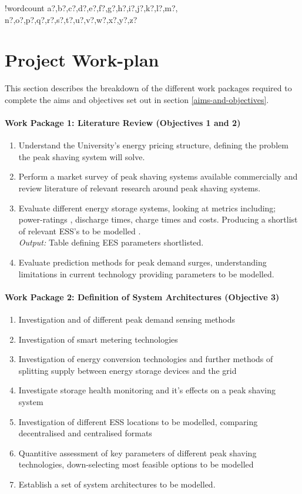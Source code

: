 \documentclass[10pt]{article}
\let\oldparagraph\paragraph
\renewcommand{\paragraph}[1]{\oldparagraph{#1}\mbox{}}
\newcounter{words}
\newenvironment{counted}{%
  \setcounter{words}{0}
  \SearchList!{wordcount}{\stepcounter{words}}
    {a?,b?,c?,d?,e?,f?,g?,h?,i?,j?,k?,l?,m?,
    n?,o?,p?,q?,r?,s?,t?,u?,v?,w?,x?,y?,z?}
  \UndoBoundary{'}
  \SearchOrder{p;}}{%
  \StopSearching}
\begin{document}
\begin{counted}
\newpage

\section{Project Work-plan}\label{project-work-plan}

This section describes the breakdown of the different work packages
required to complete the aims and objectives set out in section
\ref{aims-and-objectives}.

\paragraph{Work Package 1: Literature Review (Objectives 1 and
2)}\label{work-package-1-literature-review-objectives-1-and-2}

\begin{enumerate}[ label={1.\arabic*}]
\item Understand the University's energy pricing structure, defining the problem the peak shaving system will solve.
\item Perform a market survey of peak shaving systems available commercially and review literature of relevant research around peak shaving systems.
\item Evaluate different energy storage systems, looking at metrics including; power-ratings , discharge times, charge times and costs. Producing a shortlist of relevant ESS's to be modelled .\\ \textit{Output:} Table defining EES parameters shortlisted.
\item Evaluate prediction methods for peak demand surges, understanding limitations in current technology providing parameters to be modelled.
\end{enumerate}

\paragraph{Work Package 2: Definition of System Architectures (Objective
3)}\label{work-package-2-definition-of-system-architectures-objective-3}

\begin{enumerate}[ label={2.\arabic*}]
\item Investigation and of different peak demand sensing methods
\item Investigation of smart metering technologies
\item Investigation of energy conversion technologies and further methods of splitting supply between energy storage devices and the grid
\item Investigate storage health monitoring and it's effects on a peak shaving system
\item Investigation of different ESS locations to be modelled, comparing decentralised and centralised formats
\item Quantitive assessment of key parameters of different peak shaving technologies, down-selecting most feasible options to be modelled
\item Establish a set of system architectures to be modelled.
\end{enumerate}


\end{counted}
\end{document}

